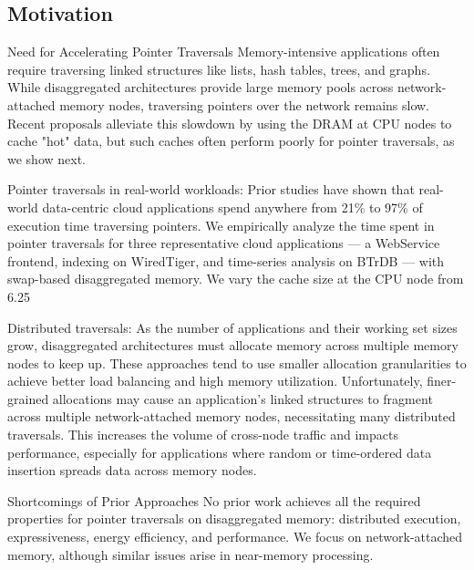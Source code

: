 \subsection{Motivation}
Need for Accelerating Pointer Traversals
Memory-intensive applications often require traversing linked structures like lists, hash tables, trees, and graphs. While disaggregated architectures provide large memory pools across network-attached memory nodes, traversing pointers over the network remains slow. Recent proposals alleviate this slowdown by using the DRAM at CPU nodes to cache "hot" data, but such caches often perform poorly for pointer traversals, as we show next.

Pointer traversals in real-world workloads: Prior studies have shown that real-world data-centric cloud applications spend anywhere from 21\% to 97\% of execution time traversing pointers. We empirically analyze the time spent in pointer traversals for three representative cloud applications — a WebService frontend, indexing on WiredTiger, and time-series analysis on BTrDB — with swap-based disaggregated memory. We vary the cache size at the CPU node from 6.25%

Distributed traversals: As the number of applications and their working set sizes grow, disaggregated architectures must allocate memory across multiple memory nodes to keep up. These approaches tend to use smaller allocation granularities to achieve better load balancing and high memory utilization. Unfortunately, finer-grained allocations may cause an application's linked structures to fragment across multiple network-attached memory nodes, necessitating many distributed traversals. This increases the volume of cross-node traffic and impacts performance, especially for applications where random or time-ordered data insertion spreads data across memory nodes.

Shortcomings of Prior Approaches
No prior work achieves all the required properties for pointer traversals on disaggregated memory: distributed execution, expressiveness, energy efficiency, and performance. We focus on network-attached memory, although similar issues arise in near-memory processing.


